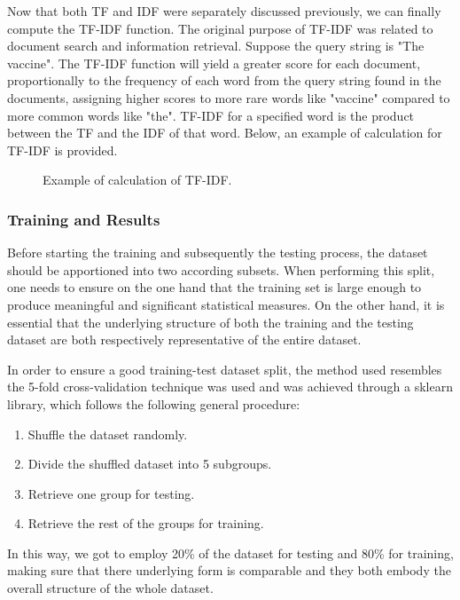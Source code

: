 Now that both TF and IDF were separately discussed previously, we can finally compute the TF-IDF function. The original purpose of TF-IDF was related to document search and information retrieval. Suppose the query string is "The vaccine". The TF-IDF function will yield a greater score for each document, proportionally to the frequency of each word from the query string found in the documents, assigning higher scores to more rare words like "vaccine" compared to more common words like "the". TF-IDF for a specified word is the product between the TF and the IDF of that word. Below, an example of calculation for TF-IDF is provided.

\begin{figure}[H]
  \centering
  \caption{Example of calculation of TF-IDF.}
\end{figure}
\subsubsection{Training and Results}

Before starting the training and subsequently the testing process, the dataset should be apportioned into two according subsets. When performing this split, one needs to ensure on the one hand that the training set is large enough to produce meaningful and significant statistical measures. On the other hand, it is essential that the underlying structure of both the training and the testing dataset are both respectively representative of the entire dataset.

In order to ensure a good training-test dataset split, the method used resembles the 5-fold cross-validation technique was used and was achieved through a sklearn library, which follows the following general procedure:
\begin{enumerate}
  \item Shuffle the dataset randomly.
  \item Divide the shuffled dataset into 5 subgroups.
  \item Retrieve one group for testing.
  \item Retrieve the rest of the groups for training.
\end{enumerate}

In this way, we got to employ 20\% of the dataset for testing and 80\% for training, making sure that there underlying form is comparable and they both embody the overall structure of the whole dataset.

